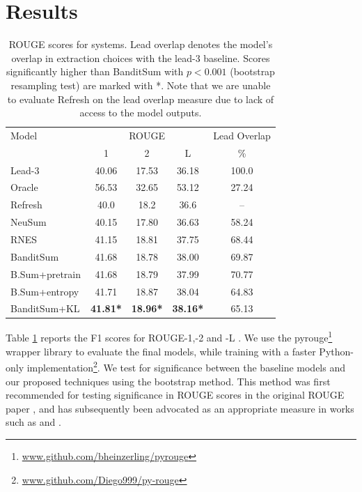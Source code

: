 \section{Results}
\label{sec:result}
\begin{table}[t]
    \centering
    \small
    \begin{tabular}{l|ccc|c}
        \toprule						
        Model	&	\multicolumn{3}{c}{ROUGE}	& Lead Overlap	\\
        	&	1	&	2	&	L	&	\%	\\ \hline
        Lead-3	&	40.06	&	17.53	&	36.18	&   100.0	\\
        Oracle	&	56.53	&	32.65	&	53.12	&	27.24	\\
        Refresh	&	40.0	&	18.2	&	36.6	&	--	\\
        NeuSum	&	40.15	&	17.80	&	36.63	&	58.24	\\
        RNES	&	41.15	&	18.81	&	37.75	&	68.44	\\\hline 
        BanditSum	    &	41.68	&	18.78	&	38.00	&	69.87	\\
        B.Sum+pretrain  &   41.68   &   18.79   &   37.99   &   70.77   \\
        B.Sum+entropy	&	41.71	&	18.87	&	38.04	&	64.83	\\
        BanditSum+KL	&	\textbf{41.81*}	&	\textbf{18.96*}	&	\textbf{38.16*}	&	65.13	\\
        \bottomrule
    \end{tabular}
    \caption[Main results from auxiliary loss method on the CNN / Dailymail dataset.]{ROUGE scores for systems. Lead overlap denotes the model's overlap in extraction choices with the lead-3 baseline. Scores significantly higher than BanditSum with $p<0.001$ (bootstrap resampling test) are marked with *. Note that we are unable to evaluate Refresh on the lead overlap measure due to lack of access to the model outputs.}
    \label{tab:results}
\end{table}

Table \ref{tab:results} reports the F1 scores for ROUGE-1,-2 and -L \parencite{eva1_lin:2004:ACLsummarization}. We use the pyrouge\footnote{\url{www.github.com/bheinzerling/pyrouge}} wrapper library to evaluate the final models, while training with a faster Python-only implementation\footnote{\url{www.github.com/Diego999/py-rouge}}. We test for significance between the baseline models and our proposed techniques using the bootstrap method. This method was first recommended for testing significance in ROUGE scores in the original ROUGE paper \parencite{eva1_lin:2004:ACLsummarization}, and has subsequently been advocated as an appropriate measure in works such as \cite{dror-hitchhikers} and \cite{berg-kirkpatrick}.

